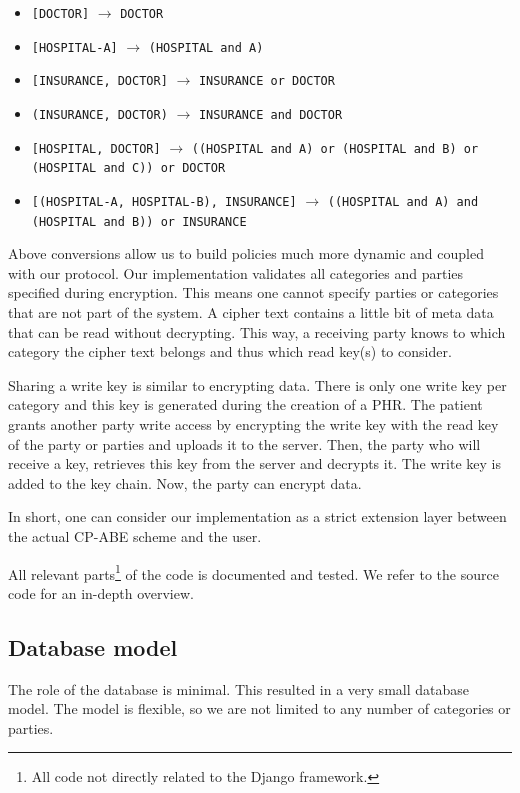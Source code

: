 \documentclass[a4paper]{article}
\begin{document}
		\begin{itemize}
			\item \texttt{[DOCTOR]} $\rightarrow$ \texttt{DOCTOR}
			\item \texttt{[HOSPITAL-A]} $\rightarrow$ \texttt{(HOSPITAL and A)}
			\item \texttt{[INSURANCE, DOCTOR]} $\rightarrow$ \texttt{INSURANCE or DOCTOR}
			\item \texttt{(INSURANCE, DOCTOR)} $\rightarrow$ \texttt{INSURANCE and DOCTOR}
			\item \texttt{[HOSPITAL, DOCTOR]} $\rightarrow$ \texttt{((HOSPITAL and A) or (HOSPITAL and B) or (HOSPITAL and C)) or DOCTOR}
			\item \texttt{[(HOSPITAL-A, HOSPITAL-B), INSURANCE]} $\rightarrow$ \texttt{((HOSPITAL and A) and (HOSPITAL and B)) or INSURANCE}
		\end{itemize}
		
		Above conversions allow us to build policies much more dynamic and coupled with our protocol. Our implementation validates all categories and parties specified during encryption. This means one cannot specify parties or categories that are not part of the system. A cipher text contains a little bit of meta data that can be read without decrypting. This way, a receiving party knows to which category the cipher text belongs and thus which read key(s) to consider.
		
		Sharing a write key is similar to encrypting data. There is only one write key per category and this key is generated during the creation of a PHR. The patient grants another party write access by encrypting the write key with the read key of the party or parties and uploads it to the server. Then, the party who will receive a key, retrieves this key from the server and decrypts it. The write key is added to the key chain. Now, the party can encrypt data.
		
		In short, one can consider our implementation as a strict extension layer between the actual CP-ABE scheme and the user.
				
		All relevant parts\footnote{All code not directly related to the Django framework.} of the code is documented and tested. We refer to the source code for an in-depth overview.
	
	\subsection{Database model}
		The role of the database is minimal. This resulted in a very small database model. The model is flexible, so we are not limited to any number of categories or parties.
		
\end{document}
